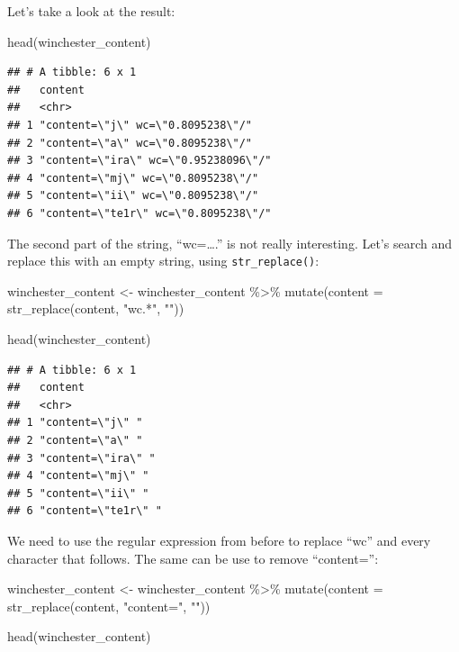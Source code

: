 \documentclass[
]{article}
\newenvironment{Shaded}{\begin{snugshade}}{\end{snugshade}}
\newcommand{\AttributeTok}[1]{\textcolor[rgb]{0.77,0.63,0.00}{#1}}
\newcommand{\FunctionTok}[1]{\textcolor[rgb]{0.00,0.00,0.00}{#1}}
\newcommand{\NormalTok}[1]{#1}
\newcommand{\OtherTok}[1]{\textcolor[rgb]{0.56,0.35,0.01}{#1}}
\newcommand{\SpecialCharTok}[1]{\textcolor[rgb]{0.00,0.00,0.00}{#1}}
\newcommand{\StringTok}[1]{\textcolor[rgb]{0.31,0.60,0.02}{#1}}
\begin{document}
Let's take a look at the result:

\begin{Shaded}
\begin{Highlighting}[]
\FunctionTok{head}\NormalTok{(winchester\_content)}
\end{Highlighting}
\end{Shaded}

\begin{verbatim}
## # A tibble: 6 x 1
##   content                             
##   <chr>                               
## 1 "content=\"j\" wc=\"0.8095238\"/"   
## 2 "content=\"a\" wc=\"0.8095238\"/"   
## 3 "content=\"ira\" wc=\"0.95238096\"/"
## 4 "content=\"mj\" wc=\"0.8095238\"/"  
## 5 "content=\"ii\" wc=\"0.8095238\"/"  
## 6 "content=\"te1r\" wc=\"0.8095238\"/"
\end{verbatim}

The second part of the string, ``wc=\ldots.'' is not really interesting. Let's search and replace this
with an empty string, using \texttt{str\_replace()}:

\begin{Shaded}
\begin{Highlighting}[]
\NormalTok{winchester\_content }\OtherTok{\textless{}{-}}\NormalTok{ winchester\_content }\SpecialCharTok{\%\textgreater{}\%} 
  \FunctionTok{mutate}\NormalTok{(}\AttributeTok{content =} \FunctionTok{str\_replace}\NormalTok{(content, }\StringTok{"wc.*"}\NormalTok{, }\StringTok{""}\NormalTok{))}

\FunctionTok{head}\NormalTok{(winchester\_content)}
\end{Highlighting}
\end{Shaded}

\begin{verbatim}
## # A tibble: 6 x 1
##   content            
##   <chr>              
## 1 "content=\"j\" "   
## 2 "content=\"a\" "   
## 3 "content=\"ira\" " 
## 4 "content=\"mj\" "  
## 5 "content=\"ii\" "  
## 6 "content=\"te1r\" "
\end{verbatim}

We need to use the regular expression from before to replace ``wc'' and every character that follows.
The same can be use to remove ``content='':

\begin{Shaded}
\begin{Highlighting}[]
\NormalTok{winchester\_content }\OtherTok{\textless{}{-}}\NormalTok{ winchester\_content }\SpecialCharTok{\%\textgreater{}\%} 
  \FunctionTok{mutate}\NormalTok{(}\AttributeTok{content =} \FunctionTok{str\_replace}\NormalTok{(content, }\StringTok{"content="}\NormalTok{, }\StringTok{""}\NormalTok{))}

\FunctionTok{head}\NormalTok{(winchester\_content)}
\end{Highlighting}
\end{Shaded}
\end{document}
